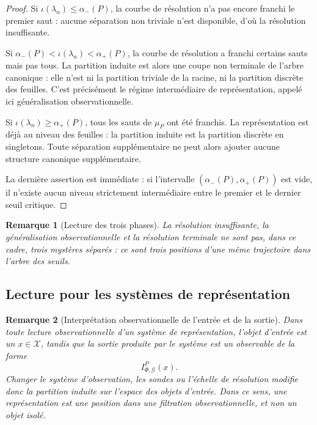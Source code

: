 \documentclass[11pt,a4paper]{article}
\newtheorem{remark}{Remarque}
\begin{document}
\begin{appendices}
\begin{proof}
Si \(\iota(\lambda_n)\le \alpha_-(P)\), la courbe de résolution n'a pas encore franchi le premier saut : aucune séparation non triviale n'est disponible, d'où la résolution insuffisante.

Si \(\alpha_-(P)< \iota(\lambda_n)< \alpha_+(P)\), la courbe de résolution a franchi certains sauts mais pas tous. La partition induite est alors une coupe non terminale de l'arbre canonique : elle n'est ni la partition triviale de la racine, ni la partition discrète des feuilles. C'est précisément le régime intermédiaire de représentation, appelé ici généralisation observationnelle.

Si \(\iota(\lambda_n)\ge \alpha_+(P)\), tous les sauts de \(\mu_P\) ont été franchis. La représentation est déjà au niveau des feuilles : la partition induite est la partition discrète en singletons. Toute séparation supplémentaire ne peut alors ajouter aucune structure canonique supplémentaire.

La dernière assertion est immédiate : si l'intervalle \((\alpha_-(P),\alpha_+(P))\) est vide, il n'existe aucun niveau strictement intermédiaire entre le premier et le dernier seuil critique.
\end{proof}

\begin{remark}[Lecture des trois phases]
La résolution insuffisante, la généralisation observationnelle et la résolution terminale ne sont pas, dans ce cadre, trois mystères séparés : ce sont trois positions d'une même trajectoire dans l'arbre des seuils.
\end{remark}

\subsection{Lecture pour les systèmes de représentation}

\begin{remark}[Interprétation observationnelle de l'entrée et de la sortie]
Dans toute lecture observationnelle d'un système de représentation, l'objet d'entrée est un \(x\in\mathcal X\), tandis que la sortie produite par le système est un observable de la forme
\[
I_{\Phi,\mathcal G}^P(x).
\]
Changer le système d'observation, les sondes ou l'échelle de résolution modifie donc la partition induite sur l'espace des objets d'entrée. Dans ce sens, une représentation est une position dans une filtration observationnelle, et non un objet isolé.
\end{remark}


\end{appendices}
\end{document}
